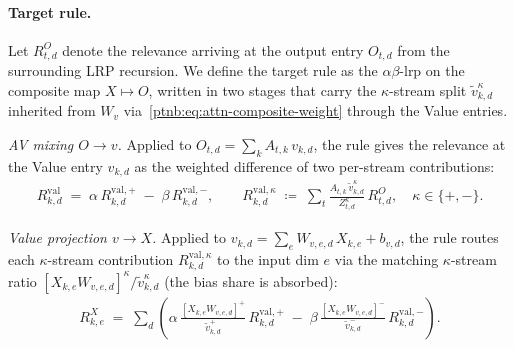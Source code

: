 \paragraph{Target rule.} Let $R^O_{t,d}$ denote the relevance arriving at the output entry $O_{t,d}$ from the surrounding
LRP recursion. We define the target rule as the $\alpha\beta$-\ac{lrp}  on the
composite map $X \mapsto O$, written in two stages that carry the $\kappa$-stream split $\tilde
    v_{k,d}^\kappa$ inherited from $W_v$ via~\eqref{ptnb:eq:attn-composite-weight} through the Value
entries. 

\emph{AV mixing $O \to v$.} Applied to $O_{t,d} = \sum_k A_{t,k}\,v_{k,d}$, the rule gives the
relevance at the Value entry $v_{k,d}$ as the weighted difference of two per-stream contributions:
\begin{align}\label{ptnb:eq:attn-target-rule}
    R^{\mathrm{val}}_{k,d} \;=\; \alpha\,R^{\mathrm{val},+}_{k,d} \;-\;
    \beta\,R^{\mathrm{val},-}_{k,d},
    \qquad
    R^{\mathrm{val},\kappa}_{k,d} \;\coloneqq\; \sum_t \frac{A_{t,k}\,\tilde
    v_{k,d}^\kappa}{Z_{t,d}^\kappa}\,R^O_{t,d},
    \quad \kappa \in \{+,-\}.
\end{align}

\emph{Value projection $v \to X$.} Applied to $v_{k,d} = \sum_e W_{v,e,d}\,X_{k,e} + b_{v,d}$, the
rule routes each $\kappa$-stream contribution $R^{\mathrm{val},\kappa}_{k,d}$ to the input dim $e$
via the matching $\kappa$-stream ratio $[X_{k,e}W_{v,e,d}]^\kappa/\tilde v_{k,d}^\kappa$ (the bias
share is absorbed):
\begin{align}\label{ptnb:eq:attn-target-input-via-V}
    R^X_{k,e} \;=\; \sum_d \left(
    \alpha\, \frac{[X_{k,e} W_{v,e,d}]^+}{\tilde v_{k,d}^+}\,R^{\mathrm{val},+}_{k,d}
    \;-\;
    \beta\, \frac{[X_{k,e} W_{v,e,d}]^-}{\tilde v_{k,d}^-}\,R^{\mathrm{val},-}_{k,d}
    \right).
\end{align}

